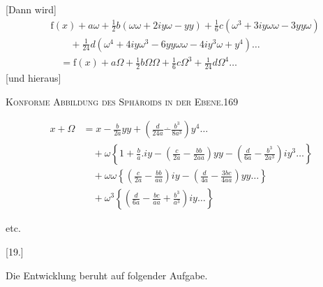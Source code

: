[Dann wird]
\[
\begin{aligned}
&\mathrm f(x)+a\omega+\tfrac12b(\omega\omega+2iy\omega-yy)+\tfrac16c(\omega^3+3iy\omega\omega-3yy\omega)\\
&\qquad+\tfrac1{24}d(\omega^4+4iy\omega^3-6yy\omega\omega-4iy^3\omega+y^4)\ldots\\
&\quad=\mathrm f(x)+a\Omega+\tfrac12b\Omega\Omega+\tfrac16c\Omega^3+\tfrac1{24}d\Omega^4\ldots
\end{aligned}
\]
[und hieraus]
\par\endgroup
\clearpage
\noindent\mbox{}\hfill\textsc{Konforme Abbildung des Sphäroids in der Ebene.}\hfill169\par\medskip
\begingroup\small
\[
\begin{aligned}
x+\Omega&=x-\frac b{2a}yy+\left(\frac d{24a}\mathbin{\overset{\scriptscriptstyle .}{-}}\frac{b^3}{8a^3}\right)y^4\ldots\\
&\quad+\omega\left\{1+\frac ba.iy-\left(\frac c{2a}-\frac{bb}{2aa}\right)yy-\left(\frac d{6a}-\frac{b^3}{2a^3}\right)iy^3\ldots\right\}\\
&\quad+\omega\omega\left\{\left(\frac c{2a}-\frac{bb}{aa}\right)iy-\left(\frac d{4a}-\frac{3bc}{4aa}\right)yy\ldots\right\}\\
&\quad+\omega^3\left\{\left(\frac d{6a}-\frac{bc}{aa}+\frac{b^3}{a^3}\right)iy\ldots\right\}
\end{aligned}
\]
\begin{center}etc.\end{center}
\bigskip
\begin{center}[19.]\end{center}
Die Entwicklung beruht auf folgender Aufgabe.

